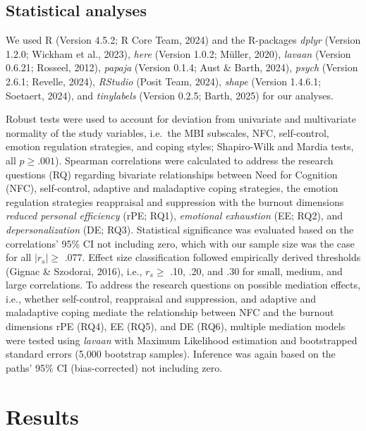 \documentclass[
  english,
  man]{apa6}
\begin{document}
\subsection{Statistical analyses}\label{statistical-analyses}

We used R (Version 4.5.2; R Core Team, 2024) and the R-packages \emph{dplyr} (Version 1.2.0; Wickham et al., 2023), \emph{here} (Version 1.0.2; Müller, 2020), \emph{lavaan} (Version 0.6.21; Rosseel, 2012), \emph{papaja} (Version 0.1.4; Aust \& Barth, 2024), \emph{psych} (Version 2.6.1; Revelle, 2024), \emph{RStudio} (Posit Team, 2024), \emph{shape} (Version 1.4.6.1; Soetaert, 2024), and \emph{tinylabels} (Version 0.2.5; Barth, 2025) for our analyses.

Robust tests were used to account for deviation from univariate and multivariate normality of the study variables, i.e.~the MBI subscales, NFC, self-control, emotion regulation strategies, and coping styles; Shapiro-Wilk and Mardia tests, all \(p\ge.001\)). Spearman correlations were calculated to address the research questions (RQ) regarding bivariate relationships between Need for Cognition (NFC), self-control, adaptive and maladaptive coping strategies, the emotion regulation strategies reappraisal and suppression with the burnout dimensions \emph{reduced personal efficiency} (rPE; RQ1), \emph{emotional exhaustion} (EE; RQ2), and \emph{depersonalization} (DE; RQ3). Statistical significance was evaluated based on the correlations' 95\% CI not including zero, which with our sample size was the case for all \(|r_{s}|\ge\) .077. Effect size classification followed empirically derived thresholds (Gignac \& Szodorai, 2016), i.e., \(r_{s} \ge\) .10, .20, and .30 for small, medium, and large correlations. To address the research questions on possible mediation effects, i.e., whether self-control, reappraisal and suppression, and adaptive and maladaptive coping mediate the relationship between NFC and the burnout dimensions rPE (RQ4), EE (RQ5), and DE (RQ6), multiple mediation models were tested using \emph{lavaan} with Maximum Likelihood estimation and bootstrapped standard errors (5,000 bootstrap samples). Inference was again based on the paths' 95\% CI (bias-corrected) not including zero.

\section{Results}\label{results}
\end{document}
